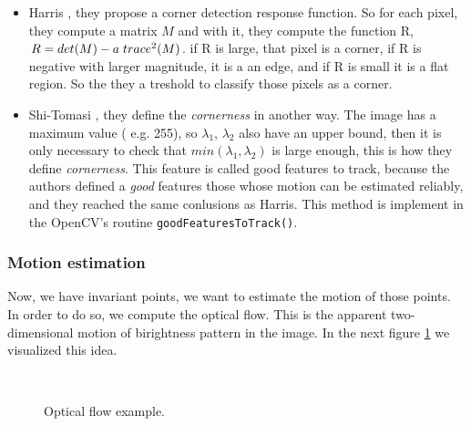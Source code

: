 \documentclass[12pt, a4paper, titlepage,twoside,openright]{article}
\begin{document}
\begin{itemize}

\item Harris \cite{harris}, they propose a corner detection response function. So for each pixel, they compute a matrix $M$ and with it, they compute the function
R, $R = det(M)-a \hspace{0.1cm} trace^{2}(M)$. if R is large, that pixel is a corner, if R is negative with larger magnitude, it is a an edge, and if R is small it is a 
flat region. So the they a treshold to classify those pixels as a corner. 

\item Shi-Tomasi \cite{shi}, they define the \textit{cornerness} in another way. The image has a maximum value ( e.g. 255), so $\lambda_{1}$, $\lambda_{2}$ also have an upper bound, then it is only necessary to check that $min(\lambda_{1},\lambda_{2})$ is large enough, this is how they define \textit{cornerness}. This feature is called good features to track, because the authors defined a \textit{good} features those whose motion can be estimated reliably, and they reached the same conlusions as Harris. This method is implement in the OpenCV's routine \texttt{goodFeaturesToTrack()}.

\end{itemize}

\subsubsection{Motion estimation}

Now, we have invariant points, we want to estimate the motion of those points. In order to do so, we compute the optical flow. This is the apparent two-dimensional motion of birightness pattern in the image. In the next figure \ref{refArchiteOF} we visualized this idea.


\begin{figure}[H]
		
\centering

\\


\caption{Optical flow example.}
\label{refArchiteOF}
\end{figure}
\end{document}
